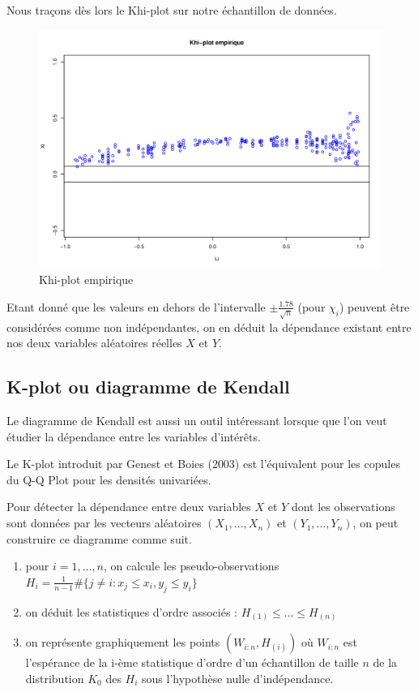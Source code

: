 Nous traçons dès lors le Khi-plot sur notre échantillon de données.

\noindent%
\begin{figure}[H]
    \begin{center}
      \includegraphics[width=14 cm, angle=0]{./pictures/chi_plot_empir.png}
      \centering\caption{Khi-plot empirique}
    \end{center}
\end{figure}

Etant donné que les valeurs en dehors de l'intervalle $\pm \frac{1.78}{\sqrt{n}}$ (pour $\chi_i$) peuvent être considérées comme non indépendantes, on en déduit
la dépendance existant entre nos deux variables aléatoires réelles $X$ et $Y$. 

\subsection{K-plot ou diagramme de Kendall}

Le diagramme de Kendall est aussi un outil intéressant lorsque que l'on veut étudier la dépendance entre les variables d'intérêts.

Le K-plot introduit par Genest et Boies (2003) est l'équivalent pour les copules du Q-Q Plot pour les
densités univariées.

Pour détecter la dépendance entre deux variables $X$ et $Y$ dont les observations sont données par les vecteurs aléatoires $(X_1,...,X_n)$ et
$(Y_1,...,Y_n)$, on peut construire ce diagramme comme suit.

\begin{enumerate}
\item pour $i=1,...,n$, on calcule les pseudo-observations $H_i = \frac{1}{n-1} \# \{j \neq i : x_j \leq x_i, y_j \leq y_i \}$
\item on déduit les statistiques d'ordre associés : $H_{(1)} \leq ... \leq H_{(n)}$
\item on représente graphiquement les points $(W_{i:n},H_{(i)})$ où $W_{i:n}$ est l'espérance de la i-ème statistique d'ordre 
d'un échantillon de taille $n$ de la distribution $K_0$ des $H_i$ sous l'hypothèse nulle d'indépendance.
\end{enumerate}

